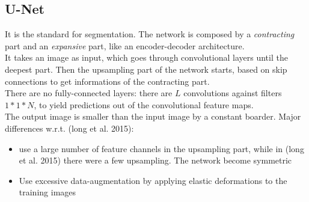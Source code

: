 

\subsection{U-Net}
It is the standard for segmentation. The network is composed by a \textit{contracting} part and an \textit{expansive} part, like an encoder-decoder architecture. \\
It takes an image as input, which goes through convolutional layers until the deepest part. Then the upsampling part of the network starts, based on skip connections to get informations of the contracting part. \\
There are no fully-connected layers: there are $L$ convolutions against filters $1*1*N$, to yield predictions out of the convolutional feature maps. \\
The output image is smaller than the input image by a constant boarder. 
Major differences w.r.t. (long et al. 2015): 
\begin{itemize}
    \item use a large number of feature channels in the upsampling part, while in (long et al. 2015) there were a few upsampling. The network become symmetric
    \item Use excessive data-augmentation by applying elastic deformations to the training images
\end{itemize}{}

